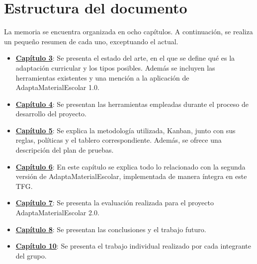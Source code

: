 \section{Estructura del documento}\label{cap:estructura}
La memoria se encuentra organizada en ocho capítulos. A continuación, se realiza un pequeño resumen de cada uno, exceptuando el actual.
\begin{itemize}
    \item \textbf{\hyperref[cap:estadoDelArte]{Capítulo 3}}: Se presenta el estado del arte, en el que se define qué es la adaptación curricular y los tipos posibles. Además se incluyen las herramientas existentes y una mención a la aplicación de AdaptaMaterialEscolar 1.0.
    \item \textbf{\hyperref[cap:herramientas]{Capítulo 4}}: Se presentan las herramientas empleadas durante el proceso de desarrollo del proyecto.
    \item \textbf{\hyperref[cap:metodologia]{Capítulo 5}}: Se explica la metodología utilizada, Kanban, junto con sus reglas, políticas y el tablero correspondiente. Además, se ofrece una descripción del plan de pruebas.
    \item \textbf{\hyperref[cap:AdaptaMaterialEscolar2.0]{Capítulo 6}}: En este capítulo se explica todo lo relacionado con la segunda versión de AdaptaMaterialEscolar, implementada de manera íntegra en este TFG.
    \item \textbf{\hyperref[cap:evaluacion]{Capítulo 7}}: Se presenta la evaluación realizada para el proyecto AdaptaMaterialEscolar 2.0.
    \item \textbf{\hyperref[cap:conclusiones]{Capítulo 8}}: Se presentan las conclusiones y el trabajo futuro.
    \item \textbf{\hyperref[cap:TrabajoIndividual]{Capítulo 10}}: Se presenta el trabajo individual realizado por cada integrante del grupo.
\end{itemize}